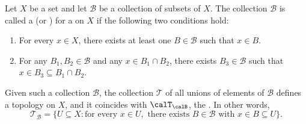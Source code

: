 \begin{definition} \label{definition:basis_for_a_topology}
Let $X$ be a set and let $\mathcal{B}$ be a collection of subsets of $X$. The collection $\mathcal{B}$ is called a  (or ) for a  on $X$ if the following two conditions hold:
\begin{enumerate}
  \item For every $x \in X$, there exists at least one $B \in \mathcal{B}$ such that $x \in B$.
  \item For any $B_1, B_2 \in \mathcal{B}$ and any $x \in B_1 \cap B_2$, there exists $B_3 \in \mathcal{B}$ such that $x \in B_3 \subseteq B_1 \cap B_2$.
\end{enumerate}
Given such a collection $\mathcal{B}$, the collection $\mathcal{T}$ of all unions of elements of $\mathcal{B}$ defines a topology on $X$, and it coincides with $\calT_\calB$, the . In other words, 
$$\mathcal{T}_\mathcal{B} = \{ U \subseteq X : \text{for every } x \in U, \text{ there exists } B \in \mathcal{B} \text{ with } x \in B \subseteq U \}.$$ 
\end{definition}